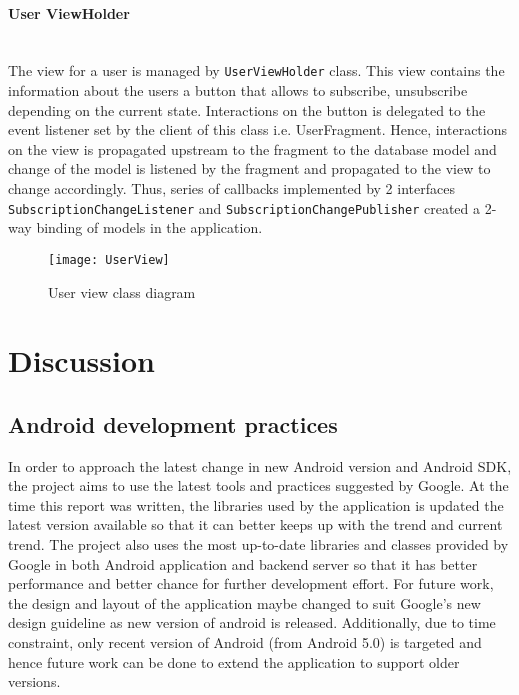 \paragraph{User ViewHolder} \mbox{} \\
The view for a user is managed by \texttt{UserViewHolder} class. This view contains the information about the users a
button that allows to subscribe, unsubscribe depending on the current state. Interactions on the button is delegated to
the event listener set by the client of this class i.e. UserFragment. Hence, interactions on the view is propagated
upstream to the fragment to the database model and change of the model is listened by the fragment and propagated to the
view to change accordingly. Thus, series of callbacks implemented by 2 interfaces \texttt{SubscriptionChangeListener} and
\texttt{SubscriptionChangePublisher} created a 2-way binding of models in the application.

\begin{figure}[!ht]
    \caption{User view class diagram}
    \centering
    \texttt{[image: UserView]}
\end{figure}
\clearpage
\section{Discussion}
\subsection{Android development practices}
In order to approach the latest change in new Android version and Android SDK, the project aims to use the latest tools
and practices suggested by Google. At the time this report was written, the libraries used by the application is updated
the latest version available so that it can better keeps up with the trend and current trend. The project also uses the
most up-to-date libraries and classes provided by Google in both Android application and backend server so that it has
better performance and better chance for further development effort.
For future work, the design and layout of the application maybe changed to suit Google's new design guideline as new
version of android is released. Additionally, due to time constraint, only recent version of Android (from Android 5.0)
is targeted and hence future work can be done to extend the application to support older versions.

